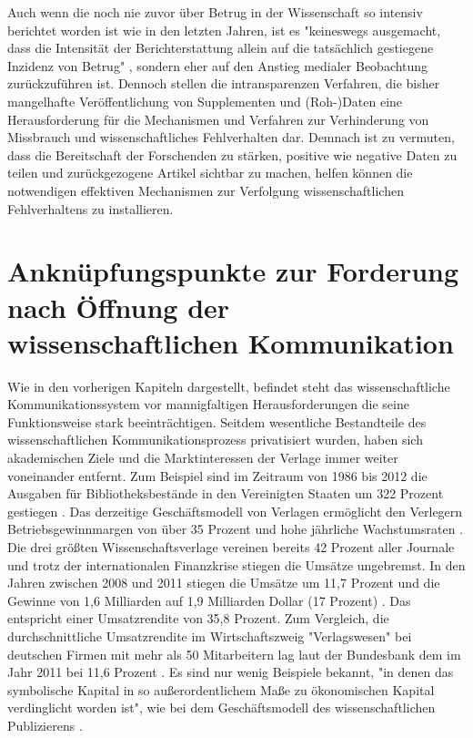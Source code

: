 Auch wenn die noch nie zuvor über Betrug in der Wissenschaft so intensiv berichtet worden ist \cite{brembs2015open} wie in den letzten Jahren, ist es "keineswegs ausgemacht, dass die Intensität der Berichterstattung allein auf die tatsächlich gestiegene Inzidenz von Betrug" \cite{weingart_2005_wissenschaft}, sondern eher auf den Anstieg medialer Beobachtung zurückzuführen ist. Dennoch stellen die intransparenzen Verfahren, die bisher mangelhafte Veröffentlichung von Supplementen und (Roh-)Daten eine Herausforderung für die Mechanismen und Verfahren zur Verhinderung von Missbrauch und wissenschaftliches Fehlverhalten dar. Demnach ist zu vermuten, dass die Bereitschaft der Forschenden zu stärken, positive wie negative Daten zu teilen und zurückgezogene Artikel sichtbar zu machen, helfen können die notwendigen effektiven Mechanismen zur Verfolgung wissenschaftlichen Fehlverhaltens \cite[:14]{wr_2015_wissenschaft_integritaet} zu installieren.

\section{Anknüpfungspunkte zur Forderung nach Öffnung der wissenschaftlichen Kommunikation}

Wie in den vorherigen Kapiteln dargestellt, befindet steht das wissenschaftliche Kommunikationssystem vor mannigfaltigen Herausforderungen die seine Funktionsweise stark beeinträchtigen. Seitdem wesentliche Bestandteile des wissenschaftlichen Kommunikationsprozess privatisiert wurden, haben sich akademischen Ziele und die Marktinteressen der Verlage immer weiter voneinander entfernt. Zum Beispiel sind im Zeitraum von 1986 bis 2012 die Ausgaben für Bibliotheksbestände in den Vereinigten Staaten um 322 Prozent gestiegen \cite{lewis_2015_future}. Das derzeitige Geschäftsmodell von Verlagen ermöglicht den Verlegern Betriebsgewinnmargen von über 35 Prozent \cite{russell_2008_business} \cite{cope2014future} und hohe jährliche Wachstumsraten \cite{Martin_2013} \cite{Wellcome_Trust_2003}. Die drei größten Wissenschaftsverlage vereinen bereits 42 Prozent aller Journale und trotz der internationalen Finanzkrise stiegen die Umsätze ungebremst. In den Jahren zwischen 2008 und 2011 stiegen die Umsätze um 11,7 Prozent und die Gewinne von 1,6 Milliarden auf 1,9 Milliarden Dollar (17 Prozent) \cite{cope2014future}. Das entspricht einer Umsatzrendite von 35,8 Prozent. Zum Vergleich, die durchschnittliche Umsatzrendite im Wirtschaftszweig "Verlagswesen" bei deutschen Firmen mit mehr als 50 Mitarbeitern lag laut der Bundesbank dem im Jahr 2011 bei 11,6 Prozent \cite{bundesbank_2014}. Es sind nur wenig Beispiele bekannt, "in denen das symbolische Kapital in so außerordentlichem Maße zu ökonomischen Kapital verdinglicht worden ist", wie bei dem Geschäftsmodell des wissenschaftlichen Publizierens \cite{hagner_2015_sache_buches}.

